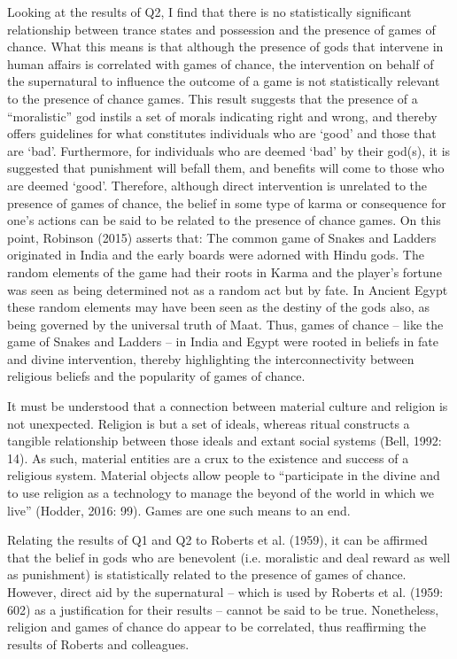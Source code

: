 \documentclass[%
	]{ijsra}
\begin{document}
Looking at the results of Q2, I find that there is no statistically significant relationship between trance states and possession and the presence of games of chance. What this means is that although the presence of gods that intervene in human affairs is correlated with games of chance, the intervention on behalf of the supernatural to influence the outcome of a game is not statistically relevant to the presence of chance games. This result suggests that the presence of a “moralistic” god instils a set of morals indicating right and wrong, and thereby offers guidelines for what constitutes individuals who are ‘good’ and those that are ‘bad’. Furthermore, for individuals who are deemed ‘bad’ by their god(s), it is suggested that punishment will befall them, and benefits will come to those who are deemed ‘good’. Therefore, although direct intervention is unrelated to the presence of games of chance, the belief in some type of karma or consequence for one’s actions can be said to be related to the presence of chance games. On this point, Robinson (2015) asserts that:
The common game of Snakes and Ladders originated in India and the early boards were adorned with Hindu gods. The random elements of the game had their roots in Karma and the player's fortune was seen as being determined not as a random act but by fate. In Ancient Egypt these random elements may have been seen as the destiny of the gods also, as being governed by the universal truth of Maat.
Thus, games of chance – like the game of Snakes and Ladders – in India and Egypt were rooted in beliefs in fate and divine intervention, thereby highlighting the interconnectivity between religious beliefs and the popularity of games of chance.

It must be understood that a connection between material culture and religion is not unexpected. Religion is but a set of ideals, whereas ritual constructs a tangible relationship between those ideals and extant social systems (Bell, 1992: 14). As such, material entities are a crux to the existence and success of a religious system. Material objects allow people to “participate in the divine and to use religion as a technology to manage the beyond of the world in which we live” (Hodder, 2016: 99). Games are one such means to an end. 

Relating the results of Q1 and Q2 to Roberts et al. (1959), it can be affirmed that the belief in gods who are benevolent (i.e. moralistic and deal reward as well as punishment) is statistically related to the presence of games of chance. However, direct aid by the supernatural – which is used by Roberts et al. (1959: 602) as a justification for their results – cannot be said to be true. Nonetheless, religion and games of chance do appear to be correlated, thus reaffirming the results of Roberts and colleagues.
\end{document}
